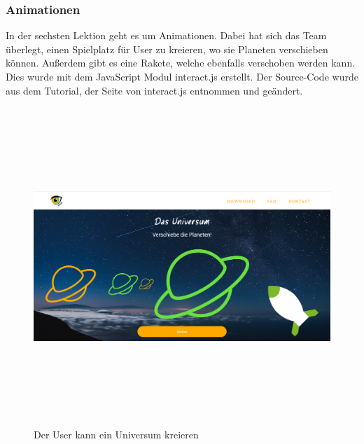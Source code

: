 \subsubsection{Animationen}
In der sechsten Lektion geht es um Animationen. Dabei hat sich das Team überlegt, einen Spielplatz für User zu kreieren, wo sie Planeten verschieben können. Außerdem gibt es eine Rakete, welche ebenfalls verschoben werden kann. Dies wurde mit dem JavaScript Modul interact.js erstellt. Der Source-Code wurde aus dem Tutorial, der Seite von interact.js entnommen und geändert. 
\begin{figure} [h]
	\centering
\includegraphics[width=12cm,height=12cm,keepaspectratio]{webseite_universum} 
	\caption{Der User kann ein Universum kreieren}
\end{figure}
